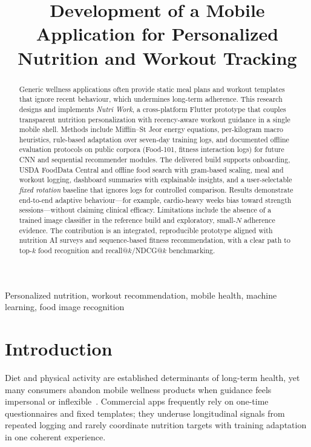 \documentclass[conference]{IEEEtran}
\begin{document}
\title{Development of a Mobile Application for Personalized Nutrition and Workout Tracking}

\author{
}

\maketitle

\begin{abstract}
Generic wellness applications often provide static meal plans and workout templates that ignore recent behaviour, which undermines long-term adherence. This research designs and implements \emph{Nutri Work}, a cross-platform Flutter prototype that couples transparent nutrition personalization with recency-aware workout guidance in a single mobile shell. Methods include Mifflin--St Jeor energy equations, per-kilogram macro heuristics, rule-based adaptation over seven-day training logs, and documented offline evaluation protocols on public corpora (Food-101, fitness interaction logs) for future CNN and sequential recommender modules. The delivered build supports onboarding, USDA FoodData Central and offline food search with gram-based scaling, meal and workout logging, dashboard summaries with explainable insights, and a user-selectable \emph{fixed rotation} baseline that ignores logs for controlled comparison. Results demonstrate end-to-end adaptive behaviour---for example, cardio-heavy weeks bias toward strength sessions---without claiming clinical efficacy. Limitations include the absence of a trained image classifier in the reference build and exploratory, small-$N$ adherence evidence. The contribution is an integrated, reproducible prototype aligned with nutrition AI surveys and sequence-based fitness recommendation, with a clear path to top-$k$ food recognition and recall@$k$/NDCG@$k$ benchmarking.
\end{abstract}

\begin{IEEEkeywords}
Personalized nutrition, workout recommendation, mobile health, machine learning, food image recognition
\end{IEEEkeywords}

\section{Introduction}
Diet and physical activity are established determinants of long-term health, yet many consumers abandon mobile wellness products when guidance feels impersonal or inflexible~\cite{armand2024systematic}. Commercial apps frequently rely on one-time questionnaires and fixed templates; they underuse longitudinal signals from repeated logging and rarely coordinate nutrition targets with training adaptation in one coherent experience.
\end{document}
